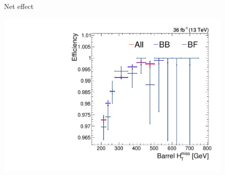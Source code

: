 \documentclass[aspectratio=169,xcolor=dvipsnames,,table,compress]{beamer}
\begin{document}
\begin{frame}
\begin{columns}[T]
\begin{column}{0.33\textwidth}
    \end{column}
    \pause 
    \begin{column}{0.33\textwidth}
      \centering 
      Net effect
      \begin{itemize}
      \end{itemize}
      \includegraphics[width=0.9\textwidth]{../figures/vbf/triggers/trigeff_nmu1barrelHTMiss.pdf}
    \end{column}
  \end{columns}
\end{frame}
\end{document}
